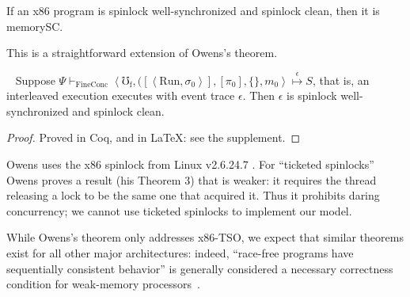 \begin{conjecture}
  If an x86 program is spinlock well-synchronized and spinlock clean, then it is
  memorySC.
\end{conjecture}
This is a straightforward extension of Owens's theorem.


\begin{theorem}
\label{thm:sync-clean}
~ \newline
Suppose 
$\Psi \vdash_\mathrm{FineConc}
\left<\mho_\mathrm{f},
([\left<\mathrm{Run},\sigma_0\right>],[\pi_0], \{\}, m_0\right>
\stackrel{\epsilon}\mapsto S$,
that is, an interleaved execution executes
with event trace $\epsilon$.
Then $\epsilon$ is spinlock well-synchronized and spinlock clean.
\end{theorem}
\begin{proof} Proved in Coq, and in \LaTeX: see the supplement. \end{proof}
  
Owens uses the x86 spinlock from Linux v2.6.24.7
\cite[Fig. 2]{owens10:ecoop}.
For ``ticketed spinlocks'' Owens proves a result (his Theorem 3)
that is weaker: it requires the thread releasing a lock to be
the same one that acquired it.  Thus it prohibits daring
concurrency; we cannot use ticketed spinlocks
to implement our model.

While Owens's theorem only addresses x86-TSO, we expect that similar theorems exist for all other major architectures: indeed, ``race-free programs have sequentially consistent behavior'' is generally considered a necessary correctness condition for weak-memory processors~\cite{adve90drf}.

